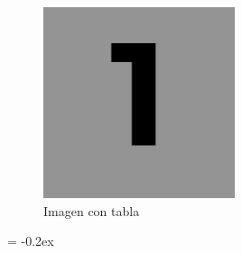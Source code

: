 \begin{minipage}[c]{0.5\linewidth}
    \begin{figure}[H]
    	\centering
    	\includegraphics[width=0.5\textwidth]{img/img1.png}
    	\caption{Imagen con tabla}
    	\label{fig:imagentabla}
    \end{figure}
\end{minipage}
\begin{minipage}[c]{0.5\linewidth}
    \begin{table}[H]
    \small
      \centering
        \extrarowheight = -0.2ex
        \renewcommand{\arraystretch}{1.75}
        \noindent{}
        \caption{Tabla con imagen}
      \label{tab:tablaimagen}
    \end{table}
\end{minipage}